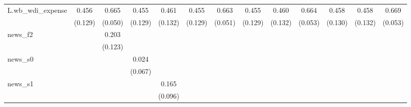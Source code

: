 {\begin{tabular}{l*{12}{c}}
\addlinespace
L.wb\_wdi\_expense&       0.456\sym{***}&       0.665\sym{***}&       0.455\sym{***}&       0.461\sym{***}&       0.455\sym{***}&       0.663\sym{***}&       0.455\sym{***}&       0.460\sym{***}&       0.664\sym{***}&       0.458\sym{***}&       0.458\sym{***}&       0.669\sym{***}\\
            &     (0.129)         &     (0.050)         &     (0.129)         &     (0.132)         &     (0.129)         &     (0.051)         &     (0.129)         &     (0.132)         &     (0.053)         &     (0.130)         &     (0.132)         &     (0.053)         \\
\addlinespace
news\_f2     &                     &       0.203         &                     &                     &                     &                     &                     &                     &                     &                     &                     &                     \\
            &                     &     (0.123)         &                     &                     &                     &                     &                     &                     &                     &                     &                     &                     \\
\addlinespace
news\_s0     &                     &                     &       0.024         &                     &                     &                     &                     &                     &                     &                     &                     &                     \\
            &                     &                     &     (0.067)         &                     &                     &                     &                     &                     &                     &                     &                     &                     \\
\addlinespace
news\_s1     &                     &                     &                     &       0.165\sym{*}  &                     &                     &                     &                     &                     &                     &                     &                     \\
            &                     &                     &                     &     (0.096)         &                     &                     &                     &                     &                     &                     &                     &                     \\

\end{tabular}}
